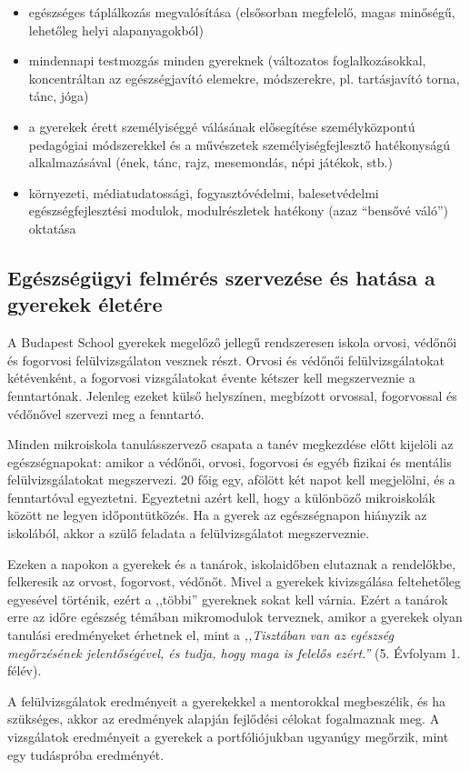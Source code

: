 \begin{itemize}

    \item
          egészséges táplálkozás megvalósítása (elsősorban megfelelő, magas minőségű, lehetőleg helyi alapanyagokból)
    \item
          mindennapi testmozgás minden gyereknek (változatos foglalkozásokkal, koncentráltan az egészségjavító elemekre, módszerekre, pl. tartásjavító torna, tánc, jóga)
    \item
          a gyerekek érett személyiséggé válásának elősegítése személyközpontú pedagógiai módszerekkel és a művészetek személyiségfejlesztő hatékonyságú alkalmazásával (ének, tánc, rajz, mesemondás, népi játékok, stb.)
    \item
          környezeti, médiatudatossági, fogyasztóvédelmi, balesetvédelmi egészségfejlesztési modulok, modulrészletek hatékony (azaz ``bensővé váló'') oktatása
\end{itemize}

\subsection{Egészségügyi felmérés szervezése és hatása a gyerekek életére}
A Budapest School gyerekek megelőző jellegű rendszeresen iskola orvosi, védőnői és fogorvosi felülvizsgálaton vesznek részt.  Orvosi és védőnői felülvizsgálatokat kétévenként, a fogorvosi vizsgálatokat évente kétszer kell megszerveznie a fenntartónak. Jelenleg ezeket külső helyszínen, megbízott orvossal, fogorvossal és védőnővel szervezi meg a fenntartó.
 
Minden mikroiskola tanulásszervező csapata a tanév megkezdése előtt kijelöli az egészségnapokat: amikor a védőnői, orvosi, fogorvosi és egyéb fizikai és mentális felülvizsgálatokat megszervezi. 20 főig egy, afölött két napot kell megjelölni, és a fenntartóval egyeztetni. Egyeztetni azért kell, hogy a különböző mikroiskolák között ne legyen időpontütközés. Ha a gyerek az egészségnapon hiányzik az iskolából, akkor a szülő feladata a felülvizsgálatot megszerveznie.
 
Ezeken a napokon a gyerekek és a tanárok, iskolaidőben elutaznak a rendelőkbe, felkeresik az orvost, fogorvost, védőnőt. Mivel a gyerekek kivizsgálása feltehetőleg egyesével történik, ezért a ,,többi” gyereknek sokat kell várnia. Ezért a tanárok erre az időre egészség témában mikromodulok terveznek, amikor a gyerekek olyan tanulási eredményeket érhetnek el, mint a \emph{,,Tisztában van az egészség megőrzésének jelentőségével, és tudja, hogy maga is felelős ezért.''} (5. Évfolyam 1. félév).
 
A felülvizsgálatok eredményeit a gyerekekkel a mentorokkal megbeszélik, és ha szükséges, akkor az eredmények alapján fejlődési célokat fogalmaznak meg. A vizsgálatok eredményeit a gyerekek a portfóliójukban ugyanúgy megőrzik, mint egy tudáspróba eredményét.
 
